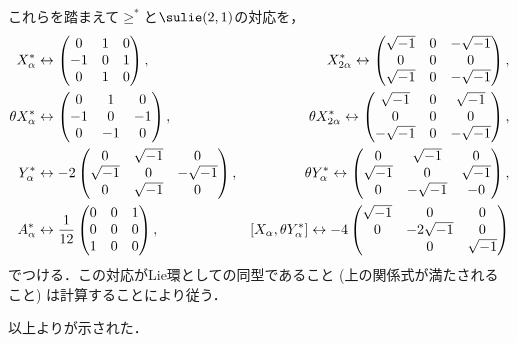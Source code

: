 \begin{npfwn}
  これらを踏まえて$\ge^{*} $と$\sulie(2,1) $の対応を，
  \begin{align*}
    X_{\alpha}^{*} & \leftrightarrow
                     \begin{pmatrix}
                       0 & 1 & 0\\ -1 & 0 & 1\\ 0 & 1 & 0
                     \end{pmatrix},&   X_{2\alpha}^{*}  \leftrightarrow
                     \begin{pmatrix}
                       \sqrt{-1} & 0 & -\sqrt{-1} \\ 0 & 0 & 0\\ \sqrt{-1} & 0 & -\sqrt{-1}
                     \end{pmatrix},\\
    \theta X_{\alpha}^{*} & \leftrightarrow
                     \begin{pmatrix}
                       0 & 1 & 0\\ -1 & 0 & -1\\ 0 & -1 & 0
                     \end{pmatrix},&   \theta X_{2\alpha}^{*}  \leftrightarrow
                     \begin{pmatrix}
                       \sqrt{-1} & 0 & \sqrt{-1} \\ 0 & 0 & 0\\ -\sqrt{-1} & 0 & -\sqrt{-1}
                     \end{pmatrix},\\
    Y_{\alpha}^{*} & \leftrightarrow
                     -2 \begin{pmatrix}
                       0 & \sqrt{-1} & 0\\ \sqrt{-1} & 0 & -\sqrt{-1} \\ 0 & \sqrt{-1} & 0
                     \end{pmatrix},&   \theta Y_{\alpha}^{*}  \leftrightarrow
                     \begin{pmatrix}
                       0 & \sqrt{-1}  & 0 \\ \sqrt{-1} & 0 & \sqrt{-1} \\ 0 & -\sqrt{-1} & -0
                     \end{pmatrix},\\
    A_{\alpha}^{*} & \leftrightarrow
                    \frac{1}{12} \begin{pmatrix}
                       0 & 0 & 1\\ 0 & 0 & 0\\ 1 & 0 & 0
                     \end{pmatrix},&   [X_{\alpha},\theta Y_{\alpha}^{*}] \leftrightarrow
                    -4 \begin{pmatrix}
                       \sqrt{-1} & 0 & 0 \\ 0 & -2\sqrt{-1} & 0\\  & 0 & \sqrt{-1}
                     \end{pmatrix}
  \end{align*}
  でつける．この対応がLie環としての同型であること (上の関係式が満たされること) は計算することにより従う．

  以上よりが示された．  
\end{npfwn}

